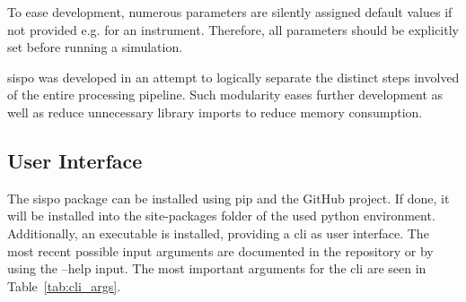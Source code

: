 To ease development, numerous parameters are silently assigned default values if not provided e.g. for an instrument. Therefore, all parameters should be explicitly set before running a simulation.

\gls{sispo} was developed in an attempt to logically separate the distinct steps involved of the entire processing pipeline. Such modularity eases further development as well as reduce unnecessary library imports to reduce memory consumption.

\subsection{User Interface}
The \gls{sispo} package can be installed using pip and the GitHub project. If done, it will be installed into the site-packages folder of the used python environment. Additionally, an executable is installed, providing a \gls{cli} as user interface. The most recent possible input arguments are documented in the repository or by using the --help input. The most important arguments for the \gls{cli} are seen in Table~\ref{tab:cli_args}.

